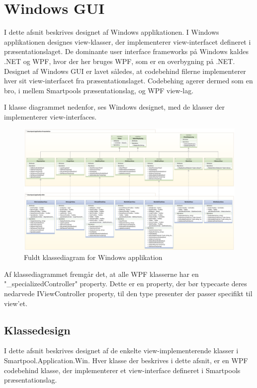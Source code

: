 \section{Windows GUI}
I dette afsnit beskrives designet af Windows applikationen. I Windows applikationen designes view-klasser, der implementerer view-interfacet defineret i præsentationslaget. De dominante user interface frameworks på Windows kaldes .NET og WPF, hvor der her bruges WPF, som er en overbygning på .NET. 
Designet af Windows GUI er lavet således, at codebehind filerne implementerer hver sit view-interfacet fra præsentationslaget.
Codebehing agerer dermed som en bro, i mellem Smartpools præsentationslag, og WPF view-lag.

I klasse diagrammet nedenfor, ses Windows designet, med de klasser der implementerer view-interfaces.
\begin{landscape}
\begin{figure}
\centering
\includegraphics[width=1\linewidth]{figs/design/win_uml_full}
\caption{Fuldt klassediagram for Windows applikation}
\label{fig:win_uml_full}
\end{figure}
\end{landscape}

Af klassediagrammet fremgår det, at alle WPF klasserne har en "\_specializedController" property. Dette er en property, der bør typecaste deres nedarvede IViewController property, til den type presenter der passer specifikt til view'et.

\subsection{Klassedesign}
I dette afsnit beskrives designet af de enkelte view-implementerende klasser i Smartpool.Application.Win. Hver klasse der beskrives i dette afsnit, er en WPF codebehind klasse, der implementerer et view-interface defineret i Smartpools præsentationslag.

